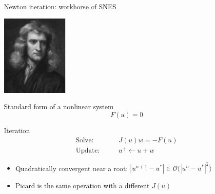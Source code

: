 \begin{frame}{Newton iteration: workhorse of SNES}
  \begin{flushright}
    \includegraphics[width=0.25\textwidth]{figures/Newton}
  \end{flushright}
  \vspace*{-4cm}
  \begin{block}{Standard form of a nonlinear system}
    \[ F(u) = 0 \]
  \end{block}
  
  \begin{block}{Iteration}
    \begin{align*}
      \text{Solve:} & \qquad J(u) w = -F(u) \\
      \text{Update:} & \qquad u^+ \gets u + w
    \end{align*}
    \begin{itemize}
    \item Quadratically convergent near a root: $|u^{n+1}-u^*| \in \mathcal{O} \Big(|u^n-u^*|^2\Big)$
    \item Picard is the same operation with a different $J(u)$
    \end{itemize}
  \end{block}
  
\end{frame}




